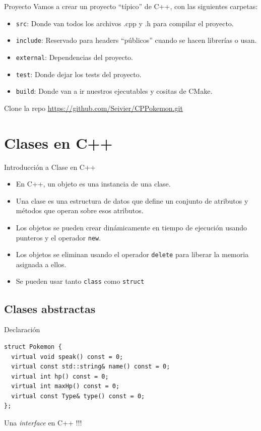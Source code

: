 \documentclass{beamer}
\begin{document}
\begin{frame}{Proyecto}
    Vamos a crear un proyecto ``típico'' de C++, con las siguientes carpetas:
   \begin{itemize}
       \item \texttt{src}: Donde van todos los archivos .cpp y .h para compilar el proyecto.
       \item \texttt{include}: Reservado para headers ``públicos'' cuando se hacen librerías o usan.
       \item \texttt{external}: Dependencias del proyecto.
       \item \texttt{test}: Donde dejar los tests del proyecto.
       \item \texttt{build}: Donde van a ir nuestros ejecutables y cositas de CMake.
   \end{itemize}
    Clone la repo \url{https://github.com/Seivier/CPPokemon.git}
\end{frame}

\section{Clases en C++}
\begin{frame}{Introducción a Clase en C++}
\begin{itemize}
\item En C++, un objeto es una instancia de una clase.
\item Una clase es una estructura de datos que define un conjunto de atributos y métodos que operan sobre esos atributos.
\item Los objetos se pueden crear dinámicamente en tiempo de ejecución usando punteros y el operador \texttt{new}.
\item Los objetos se eliminan usando el operador \texttt{delete} para liberar la memoria asignada a ellos.
\item Se pueden usar tanto \texttt{class} como \texttt{struct}
\end{itemize}
\end{frame}

%

\subsection{Clases abstractas}

\begin{frame}[fragile]{Declaración}
\begin{verbatim}
struct Pokemon {
  virtual void speak() const = 0;
  virtual const std::string& name() const = 0;
  virtual int hp() const = 0;
  virtual int maxHp() const = 0;
  virtual const Type& type() const = 0;
};
\end{verbatim}
\begin{center}
    Una \textit{interface} en C++ !!!
\end{center}
\end{frame}
\end{document}
